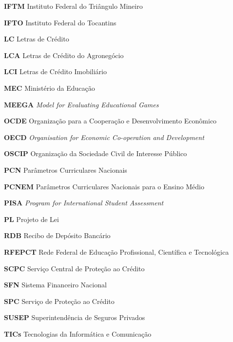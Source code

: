 \begin{siglas}
    \item[\textbf{IFTM}] Instituto Federal do Triângulo Mineiro
    \item[\textbf{IFTO}] Instituto Federal do Tocantins
    \item[\textbf{LC}] Letras de Crédito
    \item[\textbf{LCA}] Letras de Crédito do Agronegócio
    \item[\textbf{LCI}] Letras de Crédito Imobiliário
    \item[\textbf{MEC}] Ministério da Educação
    \item[\textbf{MEEGA}] \textit {Model for Evaluating Educational Games}
    \item[\textbf{OCDE}] Organização para a Cooperação e Desenvolvimento Econômico
    \item[\textbf{OECD}] \textit {Organisation for Economic Co-operation and Development}
    \item[\textbf{OSCIP}] Organização da Sociedade Civil de Interesse Público
    \item[\textbf{PCN}] Parâmetros Curriculares Nacionais
    \item[\textbf{PCNEM}] Parâmetros Curriculares Nacionais para o Ensino Médio
    \item[\textbf{PISA}] \textit {Program for International Student Assessment}
    \item[\textbf{PL}] Projeto de Lei
    \item[\textbf{RDB}] Recibo de Depósito Bancário
    \item[\textbf{RFEPCT}] Rede Federal de Educação Profissional, Científica e Tecnológica
    \item[\textbf{SCPC}] Serviço Central de Proteção ao Crédito
    \item[\textbf{SFN}] Sistema Financeiro Nacional
    \item[\textbf{SPC}] Serviço de Proteção ao Crédito
    \item[\textbf{SUSEP}] Superintendência de Seguros Privados
    \item[\textbf{TICs}] Tecnologias da Informática e Comunicação
\end{siglas}
